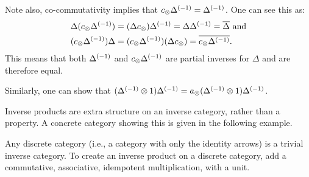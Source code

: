 \begin{remark}
  Note also, co-commutativity implies that $c_{\otimes}{\Delta}^{(-1)} = {\Delta}^{(-1)}$.
  One can see this as:
  \begin{align*}
    \Delta(c_{\otimes}{\Delta}^{(-1)})
      &= (\Delta c_{\otimes}){\Delta}^{(-1)} = \Delta{\Delta}^{(-1)} = \overline{\Delta} \text{ and}\\
    (c_{\otimes}{\Delta}^{(-1)})\Delta
      & = (c_{\otimes}{\Delta}^{(-1)})(\Delta c_{\otimes}) = \overline{c_{\otimes}{\Delta}^{(-1)}}.
  \end{align*}
  This means that both ${\Delta}^{(-1)}$ and $c_{\otimes}{\Delta}^{(-1)}$ are partial inverses for $\Delta$
  and are therefore equal.

  Similarly, one can show that $({\Delta}^{(-1)}\otimes 1){\Delta}^{(-1)} =
  a_{\otimes}({\Delta}^{(-1)}\otimes 1){\Delta}^{(-1)}$.
\end{remark}





Inverse products are extra structure on an inverse category, rather than a property. A concrete
category showing this is given in the following example.

\begin{example}
  \label{example:invprodisstructure}
\end{example}
Any discrete category (i.e., a category with only the identity arrows) is a trivial inverse
category. To create an inverse product on a discrete category, add a commutative, associative,
idempotent multiplication, with a unit.

